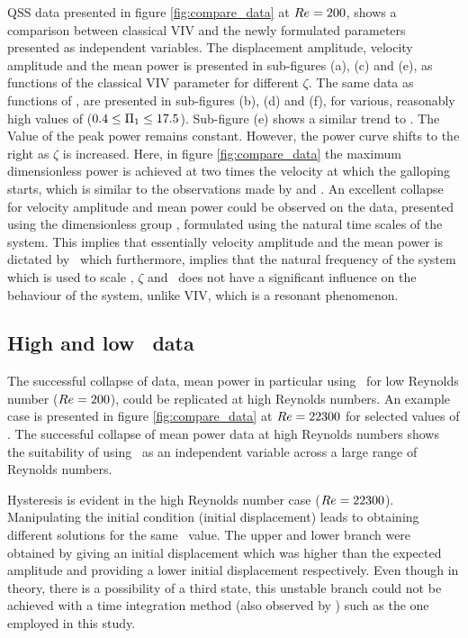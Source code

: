 QSS data presented in figure \ref{fig:compare_data} at $Re=200$, shows a comparison between classical VIV and the newly formulated parameters presented as independent variables. The displacement amplitude, velocity amplitude and the mean power is presented in sub-figures (a), (c) and (e), as functions of the classical VIV parameter \ustar for different $\zeta$. The same data as functions of \massdamp, are presented in sub-figures (b), (d) and (f), for various, reasonably high values of \massstiff ($0.4\leq\Pi_1\leq17.5$). Sub-figure (e) shows a similar trend to \cite{Barrero-Gil2010a}. The Value of the peak power remains constant. However, the power curve shifts to the right as $\zeta$ is increased. Here, in figure \ref{fig:compare_data} the maximum dimensionless power is achieved at two times the velocity at which the galloping starts, which is similar to the observations made by \citet{Barrero-Gil2010a} and \citet{vicente-Ludlam2014}. An excellent collapse for velocity amplitude and mean power could be observed on the data, presented using the dimensionless group \massdamp, formulated using the natural time scales of the system. This implies that essentially velocity amplitude and the mean power is dictated by \massdamp\ which furthermore, implies that the natural frequency of the system which is used to scale \ustar, $\zeta$ and \massstiff\ does not have a significant influence on the behaviour of the system, unlike VIV, which is a resonant phenomenon.  
 

\subsection{High and low \reynoldsnumber \ data}
\label{subsec:high_Re_data}



The successful collapse of data, mean power in particular using \massdamp\ for low Reynolds number ($Re=200$), could be replicated at high Reynolds numbers. An example case is presented in figure \ref{fig:compare_data} at $Re=22300$ for selected values of \massstiff. The successful collapse of mean power data at high Reynolds numbers shows the suitability of using \massdamp \ as an independent variable across a large range of Reynolds numbers. 

Hysteresis is evident in the high Reynolds number case ($Re=22300$). Manipulating the initial condition (initial displacement) leads to obtaining different solutions for the same \massdamp \ value. The upper and lower branch were obtained by giving an initial displacement which was higher than the expected amplitude and providing a lower initial displacement respectively. Even though in theory, there is a possibility of a third state, this unstable branch could not be achieved with a time integration method (also observed by \citep{Vio2007}) such as the one employed in this study.

